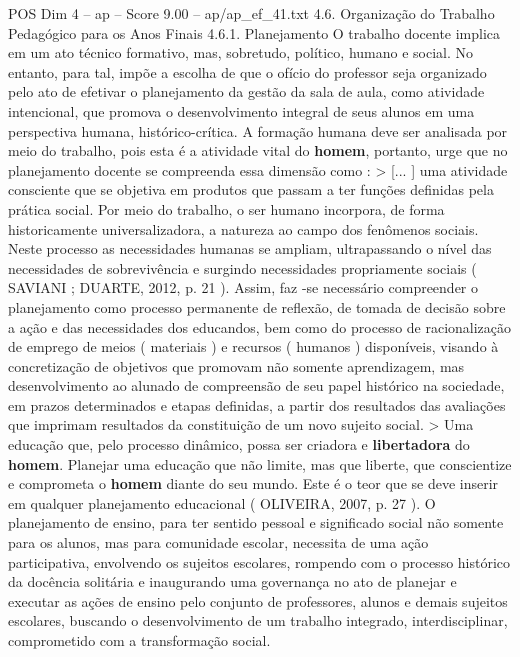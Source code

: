\begin{textsample}{POS Dim 4 – ap – Score 9.00 – ap/ap\_ef\_41.txt}  \label{ex:f4_pos_234}
4.6.
Organização do Trabalho Pedagógico para os Anos Finais 4.6.1.
Planejamento O trabalho docente implica em um ato técnico formativo, mas, sobretudo, político, humano e social.
No entanto, para tal, impõe a escolha de que o ofício do professor seja organizado pelo ato de efetivar o planejamento da gestão da sala de aula, como atividade intencional, que promova o desenvolvimento integral de seus alunos em uma perspectiva humana, histórico-crítica.
A formação humana deve ser analisada por meio do trabalho, pois esta é a atividade vital do \textbf{homem}, portanto, urge que no planejamento docente se compreenda essa dimensão como : > [... ] uma atividade consciente que se objetiva em produtos que passam a ter funções definidas pela prática social.
Por meio do trabalho, o ser humano incorpora, de forma historicamente universalizadora, a natureza ao campo dos fenômenos sociais.
Neste processo as necessidades humanas se ampliam, ultrapassando o nível das necessidades de sobrevivência e surgindo necessidades propriamente sociais ( SAVIANI ; DUARTE, 2012, p. 21 ).
Assim, faz -se necessário compreender o planejamento como processo permanente de reflexão, de tomada de decisão sobre a ação e das necessidades dos educandos, bem como do processo de racionalização de emprego de meios ( materiais ) e recursos ( humanos ) disponíveis, visando à concretização de objetivos que promovam não somente aprendizagem, mas desenvolvimento ao alunado de compreensão de seu papel histórico na sociedade, em prazos determinados e etapas definidas, a partir dos resultados das avaliações que imprimam resultados da constituição de um novo sujeito social. > Uma educação que, pelo processo dinâmico, possa ser criadora e \textbf{libertadora} do \textbf{homem}.
Planejar uma educação que não limite, mas que liberte, que conscientize e comprometa o \textbf{homem} diante do seu mundo.
Este é o teor que se deve inserir em qualquer planejamento educacional ( OLIVEIRA, 2007, p. 27 ).
O planejamento de ensino, para ter sentido pessoal e significado social não somente para os alunos, mas para comunidade escolar, necessita de uma ação participativa, envolvendo os sujeitos escolares, rompendo com o processo histórico da docência solitária e inaugurando uma governança no ato de planejar e executar as ações de ensino pelo conjunto de professores, alunos e demais sujeitos escolares, buscando o desenvolvimento de um trabalho integrado, interdisciplinar, comprometido com a transformação social.

\end{textsample}
